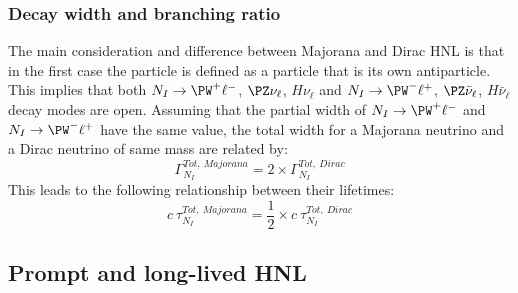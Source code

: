 \subsubsection{Decay width and branching ratio}\label{sec:decay_width}
The main consideration and difference between Majorana and Dirac HNL
is that in the first case the \hnl particle is defined as a particle
that is its own antiparticle. This implies that both $N_I\rightarrow
\PW^{+}\ell^-$, $\PZ\nu_{\ell}$, $H\nu_{\ell}$ and $N_I\rightarrow
\PW^{-}\ell^+$, $\PZ\bar{\nu}_{\ell}$, $H\bar{\nu}_{\ell}$ decay modes
are open. Assuming that the partial width of $N_I\rightarrow
\PW^{+}\ell^-$ and $N_I\rightarrow \PW^{-}\ell^+$ have the same
value, the total width for a Majorana neutrino and a Dirac
neutrino of same mass are related by:
\begin{equation}
\label{eq:width}
\Gamma^{Tot, \: Majorana}_{N_{I}} = 2 \times \Gamma^{Tot, \: Dirac}_{N_{I}}
\end{equation}
This leads to the following relationship between their lifetimes:
\begin{equation}
\label{eq:lifetime}
c\:\tau^{Tot, \: Majorana}_{N_{I}} = \frac{1}{2} \times c\:\tau^{Tot, \: Dirac}_{N_{I}}
\end{equation}

\subsection{Prompt and long-lived HNL}\label{sec:promptll}

